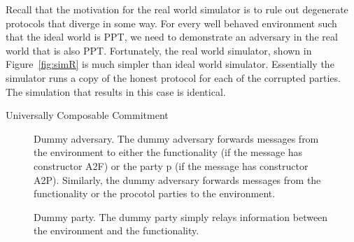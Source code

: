 Recall that the motivation for the real world simulator is to rule out degenerate protocols that diverge in some way.
For every well behaved environment such that the ideal world is \textsf{PPT}, we need to demonstrate an adversary in the real world that is also \textsf{PPT}.
Fortunately, the real world simulator, shown in Figure~\ref{fig:simR} is much simpler than ideal world simulator.
Essentially the simulator runs a copy of the honest protocol for each of the corrupted parties. The simulation that results in this case is identical.

\begin{algorithm}
\DontPrintSemicolon

\smallskip
{}
\smallskip

\caption{Universally Composable Commitment}
\label{alg:com}
\end{algorithm}

\begin{figure}

\caption{Dummy adversary. The dummy adversary forwards messages from the
environment to either the functionality (if the message has
constructor \textsf{A2F}) or the party \textsf{p} (if the message has
constructor \textsf{A2P}). Similarly, the dummy adversary forwards messages from
the functionality or the procotol parties to the environment.}
\label{fig:dummy-adversary}
\end{figure}

\begin{figure}

\caption{Dummy party. The dummy party simply relays information between the
environment and the functionality.}
\label{fig:dummy-party}
\end{figure}

